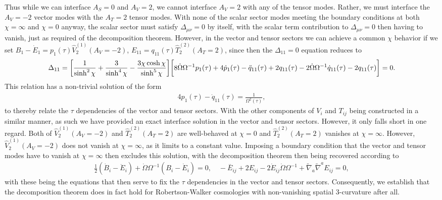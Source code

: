 \documentclass[aps,onecolumn,10pt]{revtex4}
\numberwithin{equation}{section}
\numberwithin{equation}{section}
\begin{document}
Thus while we can interface $A_S=0$ and $A_V=2$, we cannot interface $A_V=2$ with any of the tensor modes. Rather, we must interface the $A_V=-2$ vector modes with the  $A_T=2$ tensor modes. With none of the scalar sector modes meeting the boundary conditions at both $\chi=\infty$ and $\chi=0$ anyway, the scalar sector must satisfy  $\Delta_{\mu\nu}=0$ by itself, with the scalar term contribution to $\Delta_{\mu\nu}=0$ then having to vanish, just as required of the decomposition theorem. However, in the vector and tensor sectors we can achieve a common $\chi$ behavior if we set $B_1-\dot{E}_1=p_1(\tau)\hat{V}^{(1)}_2(A_V=-2)$, $E_{11}=q_{11}(\tau)\hat{T}^{(2)}_2(A_T=2)$, since then the $\Delta_{11}=0$ equation reduces to
%
\begin{eqnarray}
\Delta_{11}=\bigg{[}\frac{1}{\sinh^2\chi}+\frac{3}{\sinh^4\chi}-\frac{3\chi\cosh\chi}{\sinh^5\chi}\bigg{]}\bigg{[} 8\dot{\Omega} \Omega^{-1}p_1(\tau)+4\dot{p}_1(\tau)- \ddot{q}_{11}(\tau) +2 q_{11}(\tau)  -2\dot{\Omega} \Omega^{-1}\dot{q}_{11}(\tau) -2q_{11}(\tau)\bigg{]}=0.
\nonumber\\
\label{11.5}
\end{eqnarray}
%
This relation has a non-trivial solution of the form
%
\begin{eqnarray}
4p_1(\tau)-\dot{q}_{11}(\tau)=\frac{1}{\Omega^2(\tau)},
\label{11.6}
\end{eqnarray}
%
to thereby relate the $\tau$ dependencies of the vector and tensor sectors. With the other components of $V_i$ and $T_{ij}$ being constructed in a similar manner, as such we have provided an exact interface solution in the vector and tensor sectors. However, it only falls short in one regard. Both of $\hat{V}^{(1)}_2(A_V=-2)$ and $\hat{T}^{(2)}_2(A_T=2)$ are well-behaved at $\chi=0$ and $\hat{T}^{(2)}_2(A_T=2)$ vanishes at $\chi=\infty$. However, $\hat{V}^{(1)}_2(A_V=-2)$ does not vanish at $\chi=\infty$, as it limits to a constant value. Imposing a boundary condition that the vector and tensor modes have to vanish at $\chi=\infty$ then excludes this solution, with the decomposition theorem then being recovered according to 
%
\begin{eqnarray}
\tfrac{1}{2}(\dot{B}_i-\ddot{E}_i)+\dot{\Omega}\Omega^{-1}(B_i-\dot{E}_i)=0,\quad 
- \overset{..}{E}_{ij} +2 E_{ij} - 2 \dot{E}_{ij} \dot{\Omega} \Omega^{-1} + \tilde{\nabla}_{a}\tilde{\nabla}^{a}E_{ij}=0,
\label{11.7}
\end{eqnarray}
%
with these being the equations that then serve to fix the $\tau$ dependencies in the vector and tensor sectors.  Consequently, we establish that the decomposition theorem does in fact hold for Robertson-Walker cosmologies with non-vanishing spatial 3-curvature after all. 
\end{document}
